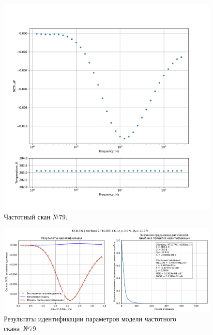 \begin{figure}[!ht]
    \centering
    \includegraphics[width=1\textwidth]{../plots/КТ117№1_п1(база 2)_2500Гц-1Гц_1пФ_+10С_-3В-11В_200мВ_20мкс_шаг_0,1.pdf}
    \caption{Частотный скан №79.}
    \label{pic:frequency_scan_79}
\end{figure}

\begin{figure}[!ht]
    \centering
    \includegraphics[width=1\textwidth]{../plots/КТ117№1_п1(база 2)_2500Гц-1Гц_1пФ_+10С_-3В-11В_200мВ_20мкс_шаг_0,1_model.pdf}
    \caption{Результаты идентификации параметров модели частотного скана~№79.}
    \label{pic:frequency_scan_model79}
\end{figure}

\pagebreak


